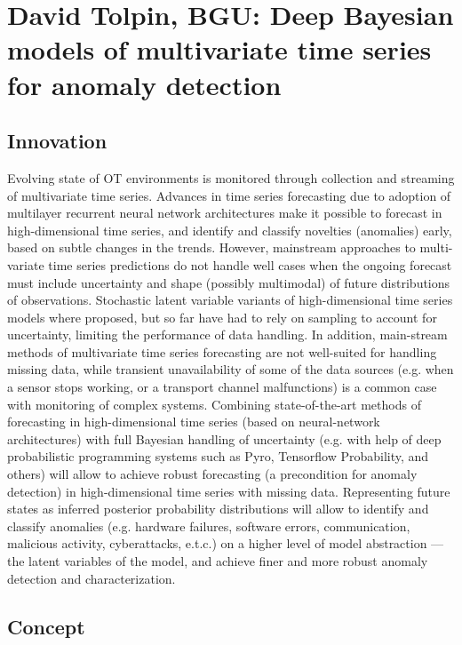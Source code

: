 \documentclass{paper}
\begin{document}
\section{David Tolpin, BGU: Deep Bayesian models of multivariate time series for anomaly detection}

\subsection{Innovation}

Evolving state of OT environments  is monitored through collection and
streaming of multivariate time series. Advances in time series forecasting due
to adoption of multilayer recurrent neural network architectures make it
possible to forecast in high-dimensional time series, and identify and
classify novelties (anomalies) early, based on subtle changes in the trends.
However, mainstream approaches to multi-variate time series predictions do not
handle well cases when the ongoing forecast must include uncertainty and shape
(possibly multimodal) of future distributions of observations. Stochastic
latent variable variants of high-dimensional time series models where
proposed, but so far have had to rely on sampling to account for uncertainty,
limiting the performance of data handling. In addition, main-stream methods of
multivariate time series forecasting are not well-suited for handling missing
data, while transient unavailability of some of the data sources (e.g. when a
sensor stops working, or a transport channel malfunctions) is  a common case
with monitoring of complex systems.  Combining state-of-the-art methods of
forecasting in high-dimensional time series (based on neural-network
architectures) with full Bayesian handling of uncertainty (e.g. with help of
deep probabilistic programming systems such as Pyro, Tensorflow Probability,
and others) will allow to achieve robust forecasting (a precondition for
anomaly detection) in high-dimensional time series with missing data.
Representing future states as inferred posterior probability distributions
will allow to identify and classify anomalies (e.g. hardware failures,
software errors, communication, malicious activity, cyberattacks, e.t.c.) on a
higher level of model abstraction — the latent variables of the model, and
achieve finer and more robust anomaly detection and characterization.

\subsection{Concept}
\end{document}

